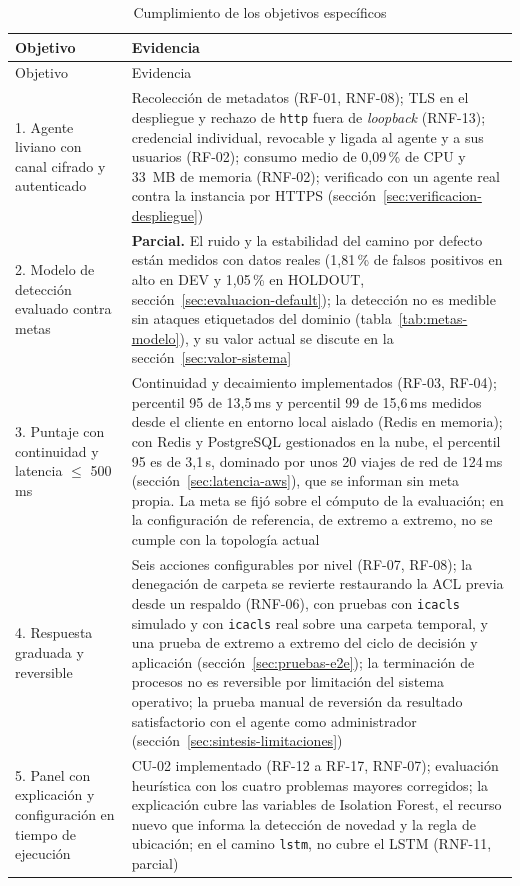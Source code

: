 \begin{longtable}{p{5.0cm}p{9.0cm}}
\caption{Cumplimiento de los objetivos específicos}\label{tab:cumplimiento-objetivos}\\
\hline
Objetivo & Evidencia \\
\hline
\endfirsthead
\hline
Objetivo & Evidencia \\
\hline
\endhead
1. Agente liviano con canal cifrado y autenticado & Recolección de metadatos (RF-01, RNF-08); TLS en el despliegue y rechazo de \texttt{http} fuera de \emph{loopback} (RNF-13); credencial individual, revocable y ligada al agente y a sus usuarios (RF-02); consumo medio de 0,09\,\% de CPU y 33~MB de memoria (RNF-02); verificado con un agente real contra la instancia por HTTPS (sección~\ref{sec:verificacion-despliegue}) \\
2. Modelo de detección evaluado contra metas & \textbf{Parcial.} El ruido y la estabilidad del camino por defecto están medidos con datos reales (1,81\,\% de falsos positivos en alto en DEV y 1,05\,\% en HOLDOUT, sección~\ref{sec:evaluacion-default}); la detección no es medible sin ataques etiquetados del dominio (tabla~\ref{tab:metas-modelo}), y su valor actual se discute en la sección~\ref{sec:valor-sistema} \\
3. Puntaje con continuidad y latencia $\leq$ 500\,ms & Continuidad y decaimiento implementados (RF-03, RF-04); percentil 95 de 13,5\,ms y percentil 99 de 15,6\,ms medidos desde el cliente en entorno local aislado (Redis en memoria); con Redis y PostgreSQL gestionados en la nube, el percentil 95 es de 3,1\,s, dominado por unos 20 viajes de red de 124\,ms (sección~\ref{sec:latencia-aws}), que se informan sin meta propia. La meta se fijó sobre el cómputo de la evaluación; en la configuración de referencia, de extremo a extremo, no se cumple con la topología actual \\
4. Respuesta graduada y reversible & Seis acciones configurables por nivel (RF-07, RF-08); la denegación de carpeta se revierte restaurando la ACL previa desde un respaldo (RNF-06), con pruebas con \texttt{icacls} simulado y con \texttt{icacls} real sobre una carpeta temporal, y una prueba de extremo a extremo del ciclo de decisión y aplicación (sección~\ref{sec:pruebas-e2e}); la terminación de procesos no es reversible por limitación del sistema operativo; la prueba manual de reversión da resultado satisfactorio con el agente como administrador (sección~\ref{sec:sintesis-limitaciones}) \\
5. Panel con explicación y configuración en tiempo de ejecución & CU-02 implementado (RF-12 a RF-17, RNF-07); evaluación heurística con los cuatro problemas mayores corregidos; la explicación cubre las variables de Isolation Forest, el recurso nuevo que informa la detección de novedad y la regla de ubicación; en el camino \texttt{lstm}, no cubre el LSTM (RNF-11, parcial) \\

\end{longtable}
